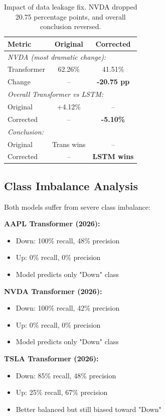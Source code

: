 \documentclass[10pt,twocolumn]{article}
\begin{document}
\begin{table}[h]
\centering
\small
\begin{tabular}{lcc}
\toprule
\textbf{Metric} & \textbf{Original} & \textbf{Corrected} \\
\midrule
\multicolumn{3}{l}{\textit{NVDA (most dramatic change):}} \\
Transformer & 62.26\% & 41.51\% \\
Change & -- & \textbf{-20.75 pp} \\
\midrule
\multicolumn{3}{l}{\textit{Overall Transformer vs LSTM:}} \\
Original & +4.12\% & -- \\
Corrected & -- & \textbf{-5.10\%} \\
\midrule
\multicolumn{3}{l}{\textit{Conclusion:}} \\
Original & Trans wins & -- \\
Corrected & -- & \textbf{LSTM wins} \\
\bottomrule
\end{tabular}
\caption{Impact of data leakage fix. NVDA dropped 20.75 percentage points, and overall conclusion reversed.}
\end{table}

\subsection{Class Imbalance Analysis}

Both models suffer from severe class imbalance:

\textbf{AAPL Transformer (2026):}
\begin{itemize}
\item Down: 100\% recall, 48\% precision
\item Up: 0\% recall, 0\% precision
\item Model predicts only "Down" class
\end{itemize}

\textbf{NVDA Transformer (2026):}
\begin{itemize}
\item Down: 100\% recall, 42\% precision
\item Up: 0\% recall, 0\% precision
\item Model predicts only "Down" class
\end{itemize}

\textbf{TSLA Transformer (2026):}
\begin{itemize}
\item Down: 85\% recall, 48\% precision
\item Up: 25\% recall, 67\% precision
\item Better balanced but still biased toward "Down"
\end{itemize}
\end{document}
